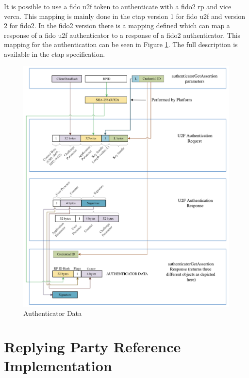 \documentclass[a4paper, 11pt]{scrartcl}
\begin{document}
It is possible to use a \gls{fido} \gls{u2f} token to authenticate with a \gls{fido2} \gls{rp} and vice verca. This mapping is mainly done in the \gls{ctap} version 1 for \gls{fido} \gls{u2f} and version 2 for \gls{fido2}. In the \gls{fido2} version there is a mapping defined which can map a response of a \gls{fido} \gls{u2f} authenticator to a response of a \gls{fido2} authenticator. This mapping for the authentication can be seen in Figure \ref{fig:authenticationMapping}. The full description is available in the \gls{ctap} specification. \cite{yubico:whatIsFido2, ctap:interoperability}

\begin{figure}[ht]
  \includegraphics[width=16cm]{img/u2fcompat-getassertion.png}
  \centering
  \caption{Authenticator Data}
  \label{fig:authenticationMapping}
\end{figure}


\section{Replying Party Reference Implementation}
\label{sec:replying_party}
\end{document}
